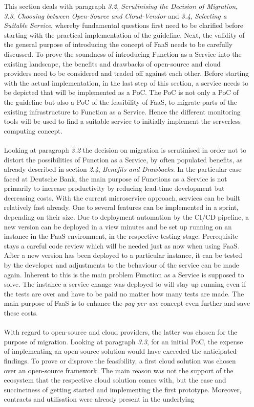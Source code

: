 \documentclass[a4paper,11pt, pagesize]{scrartcl}
\begin{document}
\begin{spacing}{1.2}
This section deals with paragraph \textit{3.2}, \textit{Scrutinising the Decision of Migration}, \textit{3.3}, \textit{Choosing between Open-Source and Cloud-Vendor} and \textit{3.4}, \textit{Selecting a Suitable Service}, whereby fundamental questions first need to be clarified before starting with the practical implementation of the guideline. Next, the validity of the general purpose of introducing the concept of FaaS needs to be carefully discussed. To prove the soundness of introducing Function as a Service into the existing landscape, the benefits and drawbacks of open-source and cloud providers need to be considered and traded off against each other. Before starting with the actual implementation, in the last step of this section, a service needs to be depicted that will be implemented as a PoC. The PoC is not only a PoC of the guideline but also a PoC of the feasibility of FaaS,  to migrate parts of the existing infrastructure to Function as a Service. Hence the different monitoring tools will be used to find a suitable service to initially implement the serverless computing concept. \\\\Looking at paragraph \textit{3.2} the decision on migration is scrutinised in order not to distort the possibilities of Function as a Service, by often populated benefits, as already described in section \textit{2.4}, \textit{Benefits and Drawbacks}. In the particular case faced at Deutsche Bank, the main purpose of Functions as a Service is not primarily to increase productivity by reducing lead-time development but decreasing costs. With the current microservice approach, services can be built relatively fast already. One to several features can be implemented in a sprint, depending on their size. Due to deployment automation by the CI/CD pipeline, a new version can be deployed in a view minutes and be set up running on an instance in the PaaS environment, in the respective testing stage. Prerequisite stays a careful code review which will be needed just as now when using FaaS. After a new version has been deployed to a particular instance, it can be tested by the developer and adjustments to the behaviour of the service can be made again. Inherent to this is the main problem Function as a Service is supposed to solve. The instance a service change was deployed to will stay up running even if the tests are over and have to be paid no matter how many tests are made. The main purpose of FaaS is to enhance the \textit{pay-per-use} concept even further and save these costs.\\\\ With regard to open-source and cloud providers, the latter was chosen for the purpose of migration. Looking at paragraph \textit{3.3}, for an initial PoC, the expense of implementing an open-source solution would have exceeded the anticipated findings. To prove or disprove the feasibility, a first cloud solution was chosen over an open-source framework. The main reason was not the support of the ecosystem that the respective cloud solution comes with, but the ease and succinctness of getting started and implementing the first prototype. Moreover, contracts and utilisation were already present in the underlying 
\end{spacing}
\end{document}
